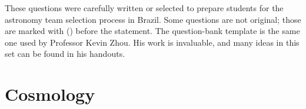 \documentclass[11pt]{article}
\begin{document}

These questions were carefully written or selected to prepare students for the astronomy team selection process in Brazil. Some questions are not original; those are marked with () before the statement. The question-bank template is the same one used by Professor Kevin Zhou. His work is invaluable, and many ideas in this set can be found in his handouts.




\section{Cosmology}
\end{document}
